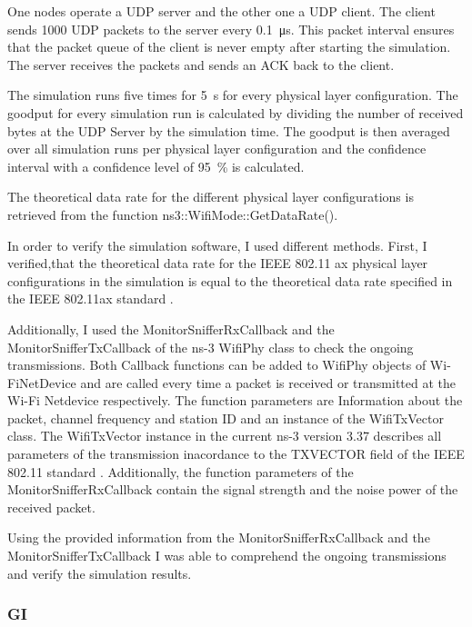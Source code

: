 One nodes operate a UDP server and the other one a UDP client.
The client sends \SI{1000}{\byte} UDP packets to the server every \SI{0.1}{\micro\second}.
This packet interval
ensures that the packet queue of the client is never empty after starting the simulation.
The server receives the packets and sends an ACK back to the client.

The simulation runs five times for \SI{5}{\second} for every physical layer configuration.
The goodput for every simulation run is calculated by dividing the number of received bytes at the UDP Server by the simulation time.
The goodput is then averaged over all simulation runs per physical layer configuration and the confidence interval with a confidence level of
\SI{95}{\percent} is calculated.

The theoretical data rate for the different physical layer configurations is retrieved from the function ns3::WifiMode::GetDataRate().

In order to verify the simulation software, I used different methods.
First, I verified,that the theoretical data rate for the IEEE 802.11 ax physical layer configurations in
the simulation is equal to the theoretical data rate specified in the IEEE 802.11ax standard \cite{noauthor_ieee_2021}.

Additionally, I used the MonitorSnifferRxCallback and the MonitorSnifferTxCallback of the ns-3 WifiPhy class to check the ongoing transmissions.
Both Callback functions can be added to WifiPhy objects of Wi-FiNetDevice and are called every time a packet is received or transmitted at the Wi-Fi Netdevice respectively.
The function parameters are Information about the packet, channel frequency and station ID and an instance of the WifiTxVector class. The WifiTxVector instance in the current ns-3 version 3.37 describes all parameters of the transmission inacordance to the TXVECTOR field of the IEEE 802.11 standard \cite{noauthor_ieee_2021}. Additionally, the function parameters of the MonitorSnifferRxCallback contain the signal strength and
the noise power of the received packet.

Using the provided information from the MonitorSnifferRxCallback and the MonitorSnifferTxCallback I was able to comprehend the ongoing transmissions and
verify the simulation results.


\subsubsection*{\acf{GI}}

